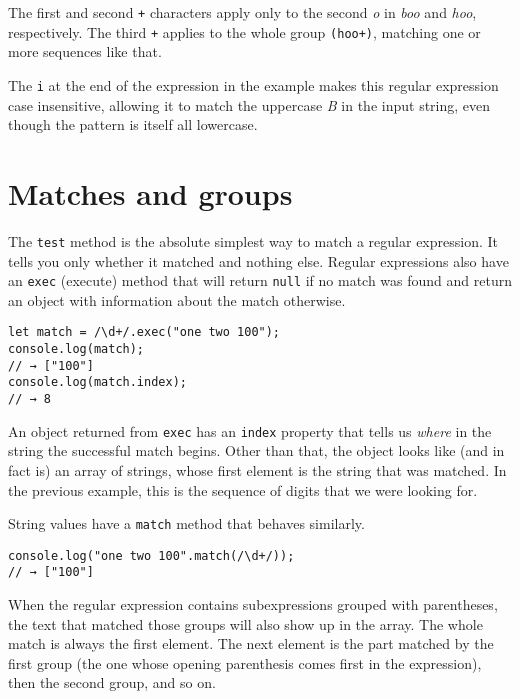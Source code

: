 The first and second \lstinline`+` characters apply only to the second \emph{o} in \emph{boo} and \emph{hoo}, respectively. The third \lstinline`+` applies to the whole group \lstinline`(hoo+)`, matching one or more sequences like that.

The \lstinline`i` at the end of the expression in the example makes this regular expression case insensitive, allowing it to match the uppercase \emph{B} in the input string, even though the pattern is itself all lowercase.

\section{Matches and groups}

The \lstinline`test` method is the absolute simplest way to match a regular expression. It tells you only whether it matched and nothing else. Regular expressions also have an \lstinline`exec` (execute) method that will return \lstinline`null` if no match was found and return an object with information about the match otherwise.

\begin{lstlisting}
let match = /\d+/.exec("one two 100");
console.log(match);
// → ["100"]
console.log(match.index);
// → 8
\end{lstlisting}
\noindent{}

An object returned from \lstinline`exec` has an \lstinline`index` property that tells us \emph{where} in the string the successful match begins. Other than that, the object looks like (and in fact is) an array of strings, whose first element is the string that was matched. In the previous example, this is the sequence of digits that we were looking for.

String values have a \lstinline`match` method that behaves similarly.

\begin{lstlisting}
console.log("one two 100".match(/\d+/));
// → ["100"]
\end{lstlisting}
\noindent{}

When the regular expression contains subexpressions grouped with parentheses, the text that matched those groups will also show up in the array. The whole match is always the first element. The next element is the part matched by the first group (the one whose opening parenthesis comes first in the expression), then the second group, and so on.

